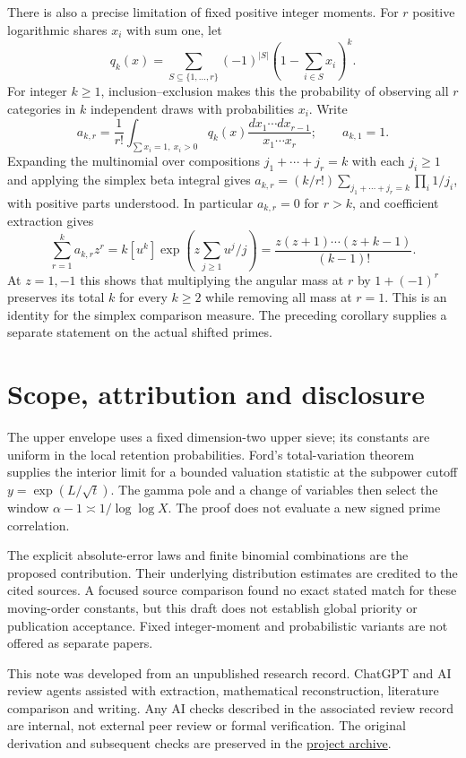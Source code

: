 \documentclass[11pt]{article}
\theoremstyle{remark}
\begin{document}
There is also a precise limitation of fixed positive integer moments.
For $r$ positive logarithmic shares $x_i$ with sum one, let
\[
 q_k(x)=\sum_{S\subseteq\{1,\ldots,r\}}(-1)^{|S|}
             \left(1-\sum_{i\in S}x_i\right)^k .
\]
For integer $k\ge1$, inclusion--exclusion makes this the probability
of observing all $r$ categories in $k$ independent draws with
probabilities $x_i$. Write
\[
 a_{k,r}=\frac1{r!}\int_{\sum x_i=1,\ x_i>0}
       q_k(x)\frac{dx_1\cdots dx_{r-1}}{x_1\cdots x_r};
 \qquad a_{k,1}=1.
\]
Expanding the multinomial over compositions $j_1+\cdots+j_r=k$
with each $j_i\ge1$ and applying the simplex beta integral gives
$a_{k,r}=(k/r!)\sum_{j_1+\cdots+j_r=k}\prod_i 1/j_i$, with
positive parts understood. In particular $a_{k,r}=0$ for $r>k$,
and coefficient extraction gives
\[
 \sum_{r=1}^k a_{k,r}z^r
    = k[u^k]\exp\!\left(z\sum_{j\ge1}u^j/j\right)
    = \frac{z(z+1)\cdots(z+k-1)}{(k-1)!}.
\]
At $z=1,-1$ this shows that multiplying the angular mass at $r$
by $1+(-1)^r$ preserves its total $k$ for every $k\ge2$ while
removing all mass at $r=1$. This is an identity for the simplex
comparison measure. The preceding corollary supplies a separate
statement on the actual shifted primes.

\section{Scope, attribution and disclosure}
The upper envelope uses a fixed dimension-two upper sieve; its constants
are uniform in the local retention probabilities. Ford's total-variation
theorem supplies the interior limit for a bounded valuation statistic at
the subpower cutoff $y=\exp(L/\sqrt t)$. The gamma pole and a change of
variables then select the window $\alpha-1\asymp1/\log\log X$.
The proof does not evaluate a new signed prime correlation.

The explicit absolute-error laws and finite binomial combinations are the
proposed contribution. Their underlying distribution estimates are credited
to the cited sources. A focused source comparison found no exact stated
match for these moving-order constants, but this draft does not establish
global priority or publication acceptance. Fixed integer-moment and
probabilistic variants are not offered as separate papers.

This note was developed from an unpublished research record. ChatGPT and
AI review agents assisted with extraction, mathematical reconstruction,
literature comparison and writing. Any AI checks described in the associated
review record are internal, not external peer review or formal verification.
The original derivation and subsequent checks are preserved in the \href{https://github.com/cosmosgeek0/Twin-Prime/tree/main/history}{project archive}.
\end{document}
